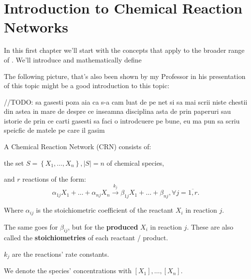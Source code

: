 \chapter{Introduction to Chemical Reaction Networks}\label{chap:ch1}

In this first chapter we'll start with the concepts that apply to the broader range of . We'll introduce and mathematically define

The following picture, that's also been shown by my Professor in his presentation of this topic might be a good introduction to this topic:

\hfill\break
//TODO: sa gasesti poza aia ca s-a cam luat de pe net
si sa mai scrii niste chestii din astea in mare de despre ce inseamna disciplina asta de prin paperuri sau istorie de prin ce carti gasesti sa faci o introdcuere pe bune, eu ma pun sa scriu speicfic de matele pe care il gasim
\hfill\break

A Chemical Reaction Network (CRN) consists of:

the set $S = \left\{ X_1, \dots, X_n \right\}, \left| S \right| = n$ of chemical species,

and $r$ reactions of the form:
\begin{equation}\label{mass-action_network}
	\alpha_{1j} X_1 + \dots + \alpha_{n j} X_n \xrightarrow{k_j} \beta_{1j} X_1 + \dots + \beta_{n j}, \forall j = \overline{1,r}.	
\end{equation}

Where $\alpha_{ij}$ is the stoichiometric coefficient of the reactant $X_i$ in reaction $j$.

The same goes for $\beta_{ij}$, but for the \textbf{produced} $X_i$ in reaction $j$. These are also called the \textbf{stoichiometries} of each reactant / product.

$k_j$ are the reactions' rate constants.

We denote the species' concentrations with $[X_1], \dots, [X_n]$.

